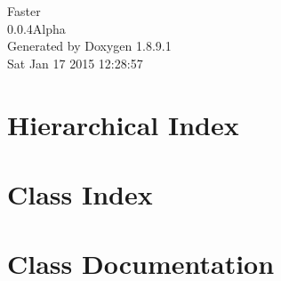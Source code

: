 \documentclass[twoside]{book}
\newcommand{\+}{\discretionary{\mbox{\scriptsize$\hookleftarrow$}}{}{}}
\newcommand{\clearemptydoublepage}{%
  \newpage{\pagestyle{empty}\cleardoublepage}%
}
\begin{document}
\hypersetup{pageanchor=false,
             bookmarks=true,
             bookmarksnumbered=true,
             pdfencoding=unicode
            }
\begin{titlepage}
\vspace*{7cm}
\begin{center}%
{\Large Faster \\[1ex]\large 0.\+0.\+4\+Alpha }\\
\vspace*{1cm}
{\large Generated by Doxygen 1.8.9.1}\\
\vspace*{0.5cm}
{\small Sat Jan 17 2015 12:28:57}\\
\end{center}
\end{titlepage}
\clearemptydoublepage
\tableofcontents
\clearemptydoublepage
{}
\hypersetup{pageanchor=true}

\chapter{Hierarchical Index}

\chapter{Class Index}

\chapter{Class Documentation}


































\backmatter
\newpage
{}
\clearemptydoublepage
{}
\printindex
\end{document}
